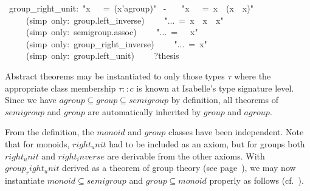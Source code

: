 \begin{isabelle}
\ group\_right\_unit:\ {"}x\ {\isasymOtimes}\ {\isasymunit}\ =\ (x{\isasymColon}'a{\isasymColon}group){"}\isanewline
{}\ -\isanewline
\ \ \ {"}x\ {\isasymOtimes}\ {\isasymunit}\ =\ x\ {\isasymOtimes}\ (x{\isasyminv}\ {\isasymOtimes}\ x){"}\isanewline
\ \ \ \ \ (simp\ only:\ group.left\_inverse)\isanewline
\ \ \ \ {"}...\ =\ x\ {\isasymOtimes}\ x{\isasyminv}\ {\isasymOtimes}\ x{"}\isanewline
\ \ \ \ \ (simp\ only:\ semigroup.assoc)\isanewline
\ \ \ \ {"}...\ =\ {\isasymunit}\ {\isasymOtimes}\ x{"}\isanewline
\ \ \ \ \ (simp\ only:\ group\_right\_inverse)\isanewline
\ \ \ \ {"}...\ =\ x{"}\isanewline
\ \ \ \ \ (simp\ only:\ group.left\_unit)\isanewline
\ \ \ \ ?thesis\ \isanewline
{}%
\begin{isamarkuptext}%
\medskip Abstract theorems may be instantiated to only those types
 $\tau$ where the appropriate class membership $\tau :: c$ is known at
 Isabelle's type signature level.  Since we have $agroup \subseteq
 group \subseteq semigroup$ by definition, all theorems of $semigroup$
 and $group$ are automatically inherited by $group$ and $agroup$.%
\end{isamarkuptext}%
%
%
\begin{isamarkuptext}%
From the definition, the $monoid$ and $group$ classes have been
 independent.  Note that for monoids, $right_unit$ had to be included
 as an axiom, but for groups both $right_unit$ and $right_inverse$ are
 derivable from the other axioms.  With $group_right_unit$ derived as
 a theorem of group theory (see page~\pageref{thm:group-right-unit}),
 we may now instantiate $monoid \subseteq semigroup$ and $group
 \subseteq monoid$ properly as follows
 (cf.\ ).


\end{isamarkuptext}
\end{isabelle}
